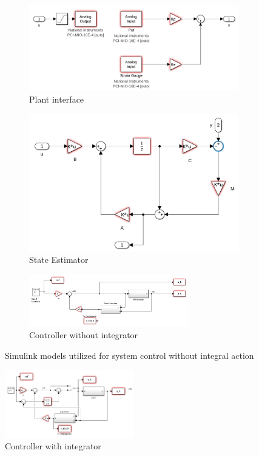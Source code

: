 \begin{figure}[H]
    \centering
    \begin{subfigure}{0.37\textwidth}
        \includegraphics[width=\textwidth]{Figs/Simulink Models/Plant Interface.png}
        \caption{Plant interface}
        \label{fig:plant_interface}
    \end{subfigure}
    \hfill
    \begin{subfigure}{0.37\textwidth}
        \includegraphics[width=\textwidth]{Figs/Simulink Models/State_Estimator.png}
        \caption{State Estimator}
        \label{fig:state_estimator}
    \end{subfigure}
    \begin{subfigure}{0.95\textwidth}
        \centering
        \includegraphics[width=0.76\textwidth]{Figs/Simulink Models/Controller_without_integrator.png}
        \caption{Controller without integrator}
        \label{fig:controller_without_integrator}
    \end{subfigure}
    \caption{Simulink models utilized for system control without integral action}
    \label{fig:simulink_models_no_integrator}
\end{figure}


\begin{figure}[H]
    \centering
    \includegraphics[width=0.5\textwidth]{Figs/Simulink Models/controller_with_integrator.png}
    \caption{Controller with integrator}
    \label{fig:controler_with_integrator}
\end{figure}
